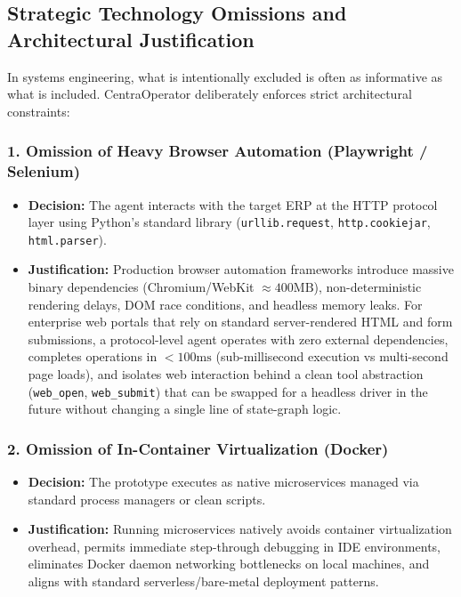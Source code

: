 \subsection{Strategic Technology Omissions and Architectural Justification}
In systems engineering, what is intentionally excluded is often as informative as what is included. CentraOperator deliberately enforces strict architectural constraints:

\subsubsection{1. Omission of Heavy Browser Automation (Playwright / Selenium)}
\begin{itemize}[leftmargin=*]
  \item \textbf{Decision:} The agent interacts with the target ERP at the HTTP protocol layer using Python's standard library (\texttt{urllib.request}, \texttt{http.cookiejar}, \texttt{html.parser}).
  \item \textbf{Justification:} Production browser automation frameworks introduce massive binary dependencies (Chromium/WebKit $\approx 400\text{MB}$), non-deterministic rendering delays, DOM race conditions, and headless memory leaks. For enterprise web portals that rely on standard server-rendered HTML and form submissions, a protocol-level agent operates with zero external dependencies, completes operations in $<100\text{ms}$ (sub-millisecond execution vs multi-second page loads), and isolates web interaction behind a clean tool abstraction (\texttt{web\_open}, \texttt{web\_submit}) that can be swapped for a headless driver in the future without changing a single line of state-graph logic.
\end{itemize}

\subsubsection{2. Omission of In-Container Virtualization (Docker)}
\begin{itemize}[leftmargin=*]
  \item \textbf{Decision:} The prototype executes as native microservices managed via standard process managers or clean scripts.
  \item \textbf{Justification:} Running microservices natively avoids container virtualization overhead, permits immediate step-through debugging in IDE environments, eliminates Docker daemon networking bottlenecks on local machines, and aligns with standard serverless/bare-metal deployment patterns.
\end{itemize}


